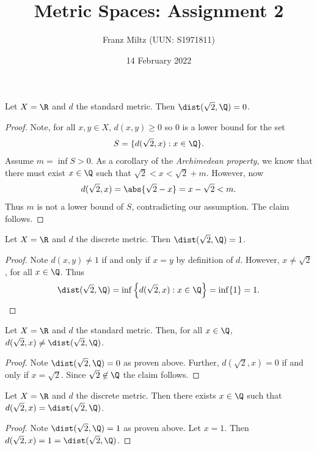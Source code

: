\documentclass{article}
\begin{document}
\title{Metric Spaces: Assignment 2}
\author{Franz Miltz (UUN: S1971811)}
\date{14 February 2022}
\maketitle

\begin{claim*}[1a]
	Let $X=\R$ and $d$ the standard metric. Then $\dist(\sqrt 2, \Q)=0$.
	\begin{proof}
		Note, for all $x,y\in X$, $d(x,y) \geq 0$ so $0$ is a lower bound for the set
		\begin{align*}
			S=\{d(\sqrt 2,x):x\in\Q\}.
		\end{align*}
		Assume $m=\inf S>0$. As a corollary of the \emph{Archimedean property}, we know that
		there must exist $x\in\Q$ such that $\sqrt 2 < x < \sqrt{2}+m$.
		However, now
		\begin{align*}
			d(\sqrt 2, x) = \abs{\sqrt 2 - x} = x - \sqrt{2} < m.
		\end{align*}
		Thus $m$ is not a lower bound of $S$, contradicting our assumption. The claim follows.
	\end{proof}
\end{claim*}

\begin{claim*}[1b]
	Let $X=\R$ and $d$ the discrete metric. Then $\dist(\sqrt 2, \Q)=1$.
	\begin{proof}
		Note $d(x,y)\not=1$ if and only if $x=y$ by definition of $d$. However,
		$x\not=\sqrt{2}$, for all $x\in\Q$. Thus
		\begin{align*}
			\dist(\sqrt 2,\Q) = \inf\left\lbrace d(\sqrt 2, x) : x\in\Q\right\rbrace = \inf\{1\} = 1.
		\end{align*}
	\end{proof}
\end{claim*}

\begin{claim*}[2]
	Let $X=\R$ and $d$ the standard metric. Then, for all $x\in\Q$, $d(\sqrt 2, x)\not=\dist(\sqrt 2, \Q)$.
	\begin{proof}
		Note $\dist(\sqrt 2, \Q)=0$ as proven above. Further, $d(\sqrt 2, x)=0$ if and only if
		$x=\sqrt 2$. Since $\sqrt 2\not\in\Q$ the claim follows.
	\end{proof}
\end{claim*}

\begin{claim*}[2]
	Let $X=\R$ and $d$ the discrete metric. Then there exists $x\in\Q$ such that
	$d(\sqrt 2, x) = \dist(\sqrt 2, \Q)$.
	\begin{proof}
		Note $\dist(\sqrt 2, \Q)=1$ as proven above. Let $x=1$. Then $d(\sqrt 2, x)=1=\dist(\sqrt 2, \Q)$.
	\end{proof}
\end{claim*}
\end{document}
